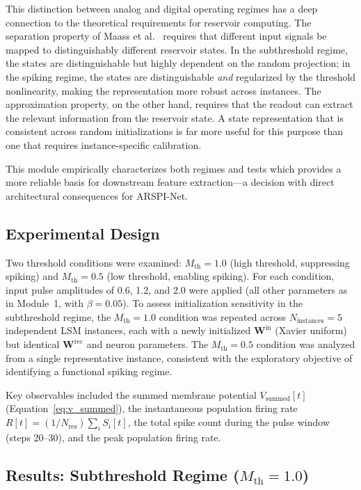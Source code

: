 This distinction between analog and digital operating regimes has a deep connection to the theoretical requirements for reservoir computing. The separation property of Maass et al.\ \cite{Maass2002RealTime} requires that different input signals be mapped to distinguishably different reservoir states. In the subthreshold regime, the states are distinguishable but highly dependent on the random projection; in the spiking regime, the states are distinguishable \emph{and} regularized by the threshold nonlinearity, making the representation more robust across instances. The approximation property, on the other hand, requires that the readout can extract the relevant information from the reservoir state. A state representation that is consistent across random initializations is far more useful for this purpose than one that requires instance-specific calibration.

This module empirically characterizes both regimes and tests which provides a more reliable basis for downstream feature extraction---a decision with direct architectural consequences for ARSPI-Net.

\subsection{Experimental Design}

Two threshold conditions were examined: $M_{\text{th}} = 1.0$ (high threshold, suppressing spiking) and $M_{\text{th}} = 0.5$ (low threshold, enabling spiking). For each condition, input pulse amplitudes of 0.6, 1.2, and 2.0 were applied (all other parameters as in Module~1, with $\beta = 0.05$). To assess initialization sensitivity in the subthreshold regime, the $M_{\text{th}} = 1.0$ condition was repeated across $N_{\text{instances}} = 5$ independent LSM instances, each with a newly initialized $\mathbf{W}^{\text{in}}$ (Xavier uniform) but identical $\mathbf{W}^{\text{rec}}$ and neuron parameters. The $M_{\text{th}} = 0.5$ condition was analyzed from a single representative instance, consistent with the exploratory objective of identifying a functional spiking regime.

Key observables included the summed membrane potential $V_{\text{summed}}[t]$ (Equation~\ref{eq:v_summed}), the instantaneous population firing rate $R[t] = (1/N_{\text{res}}) \sum_i S_i[t]$, the total spike count during the pulse window (steps 20--30), and the peak population firing rate.

\subsection{Results: Subthreshold Regime ($M_{\text{th}} = 1.0$)}
\label{sec:subthreshold_results}

